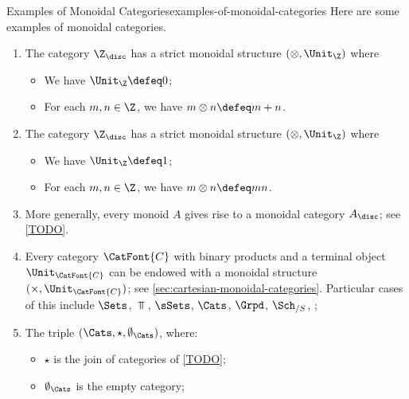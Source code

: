 \begin{example}{Examples of Monoidal Categories}{examples-of-monoidal-categories}%
    Here are some examples of monoidal categories.
    \begin{enumerate}
        \item\label{examples-of-monoidal-categories-the-integers-with-addition}The category $\Z_{\disc}$ has a strict monoidal structure $(\otimes,\Unit_{\Z})$ where
            \begin{itemize}
                \item We have $\Unit_{\Z}\defeq0$;
                \item For each $m,n\in\Z$, we have $m\otimes n\defeq m+n$.
            \end{itemize}
        \item\label{examples-of-monoidal-categories-the-integers-with-multiplication}The category $\Z_{\disc}$ has a strict monoidal structure $(\otimes,\Unit_{\Z})$ where
            \begin{itemize}
                \item We have $\Unit_{\Z}\defeq1$;
                \item For each $m,n\in\Z$, we have $m\otimes n\defeq mn$.
            \end{itemize}
        \item\label{examples-of-monoidal-categories-monoids}More generally, every monoid $A$ gives rise to a monoidal category $A_{\disc}$; see \cref{TODO}.
        \item\label{examples-of-monoidal-categories-cartesian-monoidal-categories}Every category $\CatFont{C}$ with binary products and a terminal object $\Unit_{\CatFont{C}}$ can be endowed with a monoidal structure $(\times,\Unit_{\CatFont{C}})$; see \cref{sec:cartesian-monoidal-categories}. Particular cases of this include $\Sets$, $\Top$, $\sSets$, $\Cats$, $\Grpd$, $\Sch_{/S}$, \etc;
        \item\label{examples-of-monoidal-categories-categories-and-joins}The triple $(\Cats,\star,\emptyset_{\Cats})$, where:
            \begin{itemize}
                \item $\star$ is the join of categories of \cref{TODO};
                \item $\emptyset_{\Cats}$ is the empty category;

\end{itemize}
\end{enumerate}
\end{example}
